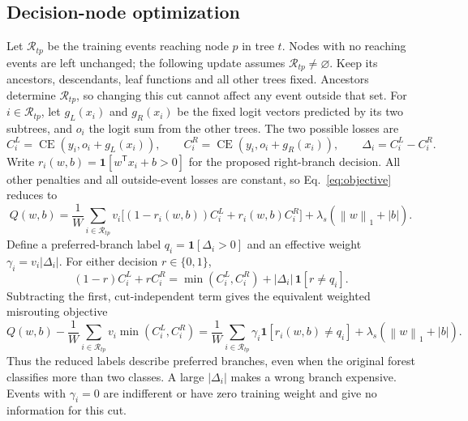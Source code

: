 \documentclass[11pt,a4paper]{article}
\newcommand{\CE}{\operatorname{CE}}
\newcommand{\ind}{\mathbf{1}}
\newcommand{\normone}[1]{\left\lVert #1\right\rVert_1}
\begin{document}
\subsection{Decision-node optimization}
Let $\mathcal R_{tp}$ be the training events reaching node $p$ in tree $t$.
Nodes with no reaching events are left unchanged; the following update assumes
$\mathcal R_{tp}\ne\varnothing$. Keep its ancestors, descendants, leaf
functions and all other trees fixed.
Ancestors determine $\mathcal R_{tp}$, so changing this cut cannot affect
any event outside that set. For $i\in\mathcal R_{tp}$, let $g_L(x_i)$ and
$g_R(x_i)$ be the fixed logit vectors predicted by its two subtrees, and
$o_i$ the logit sum from the other trees. The two possible losses are
\begin{equation}
 C_i^L=\CE(y_i,o_i+g_L(x_i)),\qquad
 C_i^R=\CE(y_i,o_i+g_R(x_i)),\qquad \Delta_i=C_i^L-C_i^R.
 \label{eq:reduced}
\end{equation}
Write $r_i(w,b)=\ind[w^{\mathsf T}x_i+b>0]$ for the proposed right-branch
decision. All other penalties and all outside-event losses are constant, so
Eq.~\eqref{eq:objective} reduces to
\begin{equation}
 Q(w,b)=\frac1W\sum_{i\in\mathcal R_{tp}}v_i
   \big[(1-r_i(w,b))C_i^L+r_i(w,b)C_i^R\big]
   +\lambda_s(\normone{w}+|b|).
 \label{eq:cut-subproblem}
\end{equation}
Define a preferred-branch label $q_i=\ind[\Delta_i>0]$ and an effective
weight $\gamma_i=v_i|\Delta_i|$. For either decision $r\in\{0,1\}$,
\begin{equation}
 (1-r)C_i^L+rC_i^R
 =\min(C_i^L,C_i^R)+|\Delta_i|\,\ind[r\ne q_i].
 \label{eq:child-loss-identity}
\end{equation}
Subtracting the first, cut-independent term gives the equivalent weighted
misrouting objective
\begin{equation}
 Q(w,b)-\frac1W\sum_{i\in\mathcal R_{tp}}v_i\min(C_i^L,C_i^R)
 =\frac1W\sum_{i\in\mathcal R_{tp}}\gamma_i\ind[r_i(w,b)\ne q_i]
  +\lambda_s(\normone{w}+|b|).
 \label{eq:misroute}
\end{equation}
Thus the reduced labels describe preferred branches, even when the original
forest classifies more than two classes. A large $|\Delta_i|$ makes a wrong
branch expensive. Events with $\gamma_i=0$ are indifferent or have zero
training weight and give no information for this cut.
\end{document}
